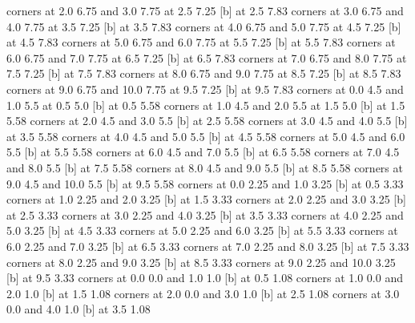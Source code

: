 {\putrectangle corners at 2.0 6.75 and 3.0 7.75
 at 2.5 7.25
 [b] at 2.5 7.83
\putrectangle corners at 3.0 6.75 and 4.0 7.75
 at 3.5 7.25
 [b] at 3.5 7.83
\putrectangle corners at 4.0 6.75 and 5.0 7.75
 at 4.5 7.25
 [b] at 4.5 7.83
\putrectangle corners at 5.0 6.75 and 6.0 7.75
 at 5.5 7.25
 [b] at 5.5 7.83
\putrectangle corners at 6.0 6.75 and 7.0 7.75
 at 6.5 7.25
 [b] at 6.5 7.83
\putrectangle corners at 7.0 6.75 and 8.0 7.75
 at 7.5 7.25
 [b] at 7.5 7.83
\putrectangle corners at 8.0 6.75 and 9.0 7.75
 at 8.5 7.25
 [b] at 8.5 7.83
\putrectangle corners at 9.0 6.75 and 10.0 7.75
 at 9.5 7.25
 [b] at 9.5 7.83
\putrectangle corners at 0.0 4.5 and 1.0 5.5
 at 0.5 5.0
 [b] at 0.5 5.58
\putrectangle corners at 1.0 4.5 and 2.0 5.5
 at 1.5 5.0
 [b] at 1.5 5.58
\putrectangle corners at 2.0 4.5 and 3.0 5.5
 [b] at 2.5 5.58
\putrectangle corners at 3.0 4.5 and 4.0 5.5
 [b] at 3.5 5.58
\putrectangle corners at 4.0 4.5 and 5.0 5.5
 [b] at 4.5 5.58
\putrectangle corners at 5.0 4.5 and 6.0 5.5
 [b] at 5.5 5.58
\putrectangle corners at 6.0 4.5 and 7.0 5.5
 [b] at 6.5 5.58
\putrectangle corners at 7.0 4.5 and 8.0 5.5
 [b] at 7.5 5.58
\putrectangle corners at 8.0 4.5 and 9.0 5.5
 [b] at 8.5 5.58
\putrectangle corners at 9.0 4.5 and 10.0 5.5
 [b] at 9.5 5.58
\putrectangle corners at 0.0 2.25 and 1.0 3.25
 [b] at 0.5 3.33
\putrectangle corners at 1.0 2.25 and 2.0 3.25
 [b] at 1.5 3.33
\putrectangle corners at 2.0 2.25 and 3.0 3.25
 [b] at 2.5 3.33
\putrectangle corners at 3.0 2.25 and 4.0 3.25
 [b] at 3.5 3.33
\putrectangle corners at 4.0 2.25 and 5.0 3.25
 [b] at 4.5 3.33
\putrectangle corners at 5.0 2.25 and 6.0 3.25
 [b] at 5.5 3.33
\putrectangle corners at 6.0 2.25 and 7.0 3.25
 [b] at 6.5 3.33
\putrectangle corners at 7.0 2.25 and 8.0 3.25
 [b] at 7.5 3.33
\putrectangle corners at 8.0 2.25 and 9.0 3.25
 [b] at 8.5 3.33
\putrectangle corners at 9.0 2.25 and 10.0 3.25
 [b] at 9.5 3.33
\putrectangle corners at 0.0 0.0 and 1.0 1.0
 [b] at 0.5 1.08
\putrectangle corners at 1.0 0.0 and 2.0 1.0
 [b] at 1.5 1.08
\putrectangle corners at 2.0 0.0 and 3.0 1.0
 [b] at 2.5 1.08
\putrectangle corners at 3.0 0.0 and 4.0 1.0
 [b] at 3.5 1.08
\endpicture}

